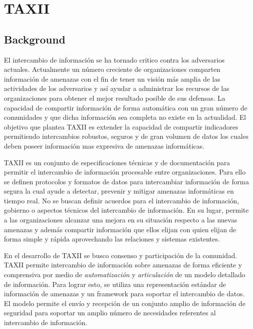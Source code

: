 
\chapter{TAXII} %

\label{Chapter2} %

\lhead{\til}
\rhead{\fu}


\section{Background}

El intercambio de información se ha tornado critico contra los adversarios actuales.
Actualmente un número creciente de organizaciones comparten 
información de amenazas con el fin de tener un visión más amplia de las 
actividades de los adversarios y así ayudar a administrar los recursos de las 
organizaciones para obtener el mejor resultado posible de sus defensas. 
La capacidad de compartir información de forma automática con un gran número
de comunidades y que dicha información sea completa no existe en la actualidad. 
El objetivo que plantea TAXII es extender 
la capacidad de compartir indicadores permitiendo intercambios robustos, seguros 
y de gran volumen de datos los cuales deben poseer información mas expresiva de 
amenazas informáticas.

TAXII es un conjunto de especificaciones técnicas y de documentación para 
permitir el intercambio de información procesable entre organizaciones. Para 
ello se definen protocolos y formatos de datos para intercambiar información de 
forma segura la cual ayude a detectar, prevenir y mitigar amenazas informáticas 
en tiempo real. No se buscan definir acuerdos para el intercambio de 
información, gobierno o aspectos técnicos del intercambio de información. En su 
lugar, permite a las organizaciones alcanzar una mejora en su situación respecto 
a las nuevas amenazas y además compartir información que ellos elijan con quien 
elijan de forma simple y rápida aprovechando las relaciones y sistemas 
existentes.

En el desarrollo de TAXII se busco consenso y participación de la comunidad. 
TAXII permite intercambio de información sobre amenazas de forma eficiente y 
comprensiva por medio de \emph{automatización} y \emph{articulación} de un 
modelo detallado de información. Para lograr esto, se utiliza una representación 
estándar de información de amenazas y un framework para soportar el intercambio 
de datos. El modelo permite el envío y recepción de un conjunto amplio de 
información de seguridad para soportar un amplio número de necesidades 
referentes al intercambio de información.

